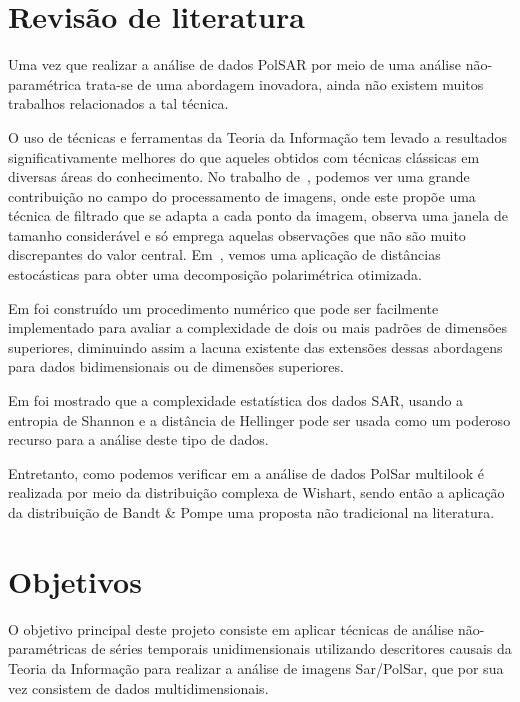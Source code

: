 \documentclass[12pt]{ctexart}
\begin{document}
\section*{Revisão de literatura}

Uma vez que realizar a análise de dados PolSAR por meio de uma análise  não-paramétrica trata-se de uma abordagem inovadora, ainda não existem muitos trabalhos relacionados a tal técnica.

O uso de técnicas e ferramentas da Teoria da Informação tem levado a resultados significativamente melhores do que aqueles obtidos com técnicas clássicas em diversas áreas do conhecimento. No trabalho de~\cite{Torres2014}, podemos ver uma grande contribuição no campo do processamento de imagens, onde este propõe uma técnica de filtrado que se adapta a cada ponto da imagem, observa uma janela de tamanho considerável e só emprega aquelas observações que não são muito discrepantes do valor central. Em~\cite{Bhattacharya2015}, vemos uma aplicação de distâncias estocásticas para obter uma decomposição polarimétrica otimizada.

Em \cite{Complexity.Two.Dimensional} foi construído um procedimento numérico que pode ser facilmente implementado para avaliar a complexidade de dois ou mais padrões de dimensões superiores, diminuindo assim a lacuna existente das extensões dessas abordagens para dados bidimensionais ou de dimensões superiores.

Em \cite{Generalized.Statistical.Complexity.of.SAR.Imagery} foi mostrado que a complexidade estatística dos dados SAR, usando a entropia de Shannon e a distância de Hellinger pode ser usada como um poderoso recurso para a análise deste tipo de dados.

Entretanto, como podemos verificar em \cite{Intensity.SAR.Imagery} a análise de dados PolSar multilook é realizada por meio da distribuição complexa de Wishart, sendo então a aplicação da distribuição de Bandt \& Pompe uma proposta não tradicional na literatura.

\section*{Objetivos}

O objetivo principal deste projeto consiste em aplicar técnicas de análise não-paramétricas de séries temporais unidimensionais utilizando descritores causais da Teoria da Informação para realizar a  análise de imagens Sar/PolSar, que por sua vez consistem de dados multidimensionais.
\end{document}
